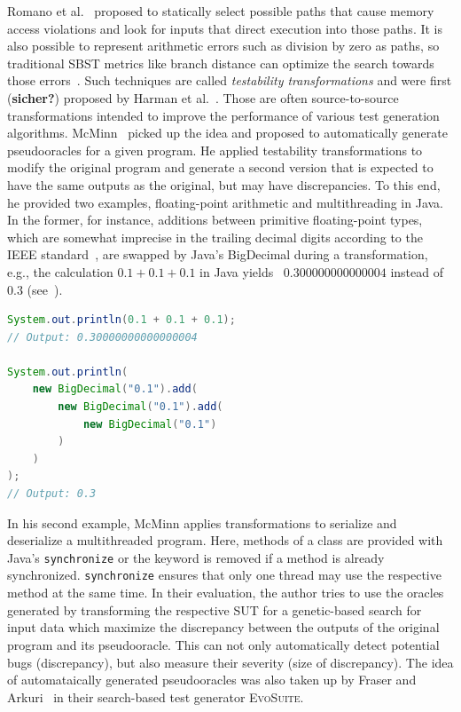 \documentclass[paper=a4,%
  twoside,%
  BCOR4mm,%
  abstract=true,%
  toc=bibliography,%
  chapterprefix=true,%
  toc=bibliographynumbered,%
  open=right,%
  english,%
  pagesize=pdftex]{scrreprt}
\begin{document}
Romano et al.~\cite{Romano2011} proposed to statically select possible paths that cause memory access violations and look for inputs that direct execution into those paths. It is also possible to represent arithmetic errors such as division by zero as paths, so traditional \ac{SBST} metrics like branch distance can optimize the search towards those errors~\cite{Bhattacharya2011}. Such techniques are called \textit{testability transformations} and were first (\textbf{sicher?}) proposed by Harman et al.~\cite{Harman2004}. Those are often source-to-source transformations intended to improve the performance of various test generation algorithms. McMinn~\cite{McMinn2009} picked up the idea and proposed to automatically generate pseudooracles for a given program. He applied testability transformations to modify the original program and generate a second version that is expected to have the same outputs as the original, but may have discrepancies. To this end, he provided two examples, floating-point arithmetic and multithreading in Java. In the former, for instance, additions between primitive floating-point types, which are somewhat imprecise in the trailing decimal digits according to the IEEE standard~\cite{10.1145/103162.103163}, are swapped by Java's BigDecimal during a transformation, e.g., the calculation $0.1 + 0.1 + 0.1$ in Java yields ~$0.300000000000004$ instead of~$0.3$ (see~).

\begin{lstlisting}[language=Java, style=boxed, caption={Comparing floating-point arithmetic in Java using double compared to \lstinline{BigDecimal}~\cite{McMinn2009}}, label=lst:java-transformations]
System.out.println(0.1 + 0.1 + 0.1);
// Output: 0.30000000000000004

System.out.println(
    new BigDecimal("0.1").add(
        new BigDecimal("0.1").add(
            new BigDecimal("0.1")
        )
    )
);
// Output: 0.3
\end{lstlisting}

In his second example, McMinn applies transformations to serialize and deserialize a multithreaded program. Here, methods of a class are provided with Java's \lstinline{synchronize} or the keyword is removed if a method is already synchronized. \lstinline{synchronize} ensures that only one thread may use the respective method at the same time. In their evaluation, the author tries to use the oracles generated by transforming the respective \ac{SUT} for a genetic-based search for input data which maximize the discrepancy between the outputs of the original program and its pseudooracle. This can not only automatically detect potential bugs (discrepancy), but also measure their severity (size of discrepancy). The idea of automataically generated pseudooracles was also taken up by Fraser and Arkuri~\cite{Fraser_2013} in their search-based test generator \textsc{EvoSuite}.
\end{document}
